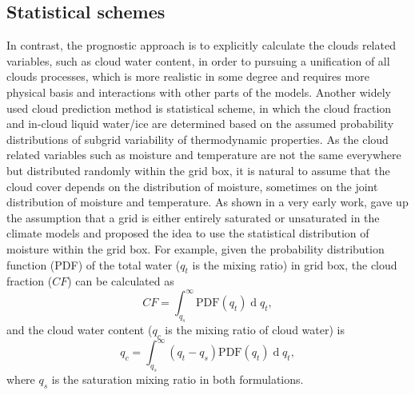 \subsection{Statistical schemes}
\label{sec:PDF_cld_scheme}

In contrast, the prognostic approach \citep[e.g.,][]{Tiedtke1993} is to explicitly calculate the clouds related variables, such as cloud water content, in order to pursuing a unification of all clouds processes, which is more realistic in some degree and requires more physical basis and interactions with other parts of the models. Another widely used cloud prediction method is statistical scheme, in which the cloud fraction and in-cloud liquid water/ice are determined based on the assumed probability distributions of subgrid variability of thermodynamic properties. As the cloud related variables such as moisture and temperature are not the same everywhere but distributed randomly within the grid box, it is natural to assume that the cloud cover depends on the distribution of moisture, sometimes on the joint distribution of moisture and temperature. As shown in a very early work, \cite{Sommeria1977} gave up the assumption that a grid is either entirely saturated or unsaturated in the climate models and proposed the idea to use the statistical distribution of moisture within the grid box. For example, given the probability distribution function (PDF) of the total water ($q_t$ is the mixing ratio) in grid box, the cloud fraction ($CF$) can be calculated as 
\begin{equation}
    CF=\int_{q_s}^{\infty}\text{PDF}(q_t)\operatorname{d}q_t,
\end{equation}
and the cloud water content ($q_c$ is the mixing ratio of cloud water) is
\begin{equation}
    q_c=\int_{q_s}^{\infty}(q_t-q_s)\text{PDF}(q_t)\operatorname{d}q_t,
\end{equation}
where $q_s$ is the saturation mixing ratio in both formulations.

